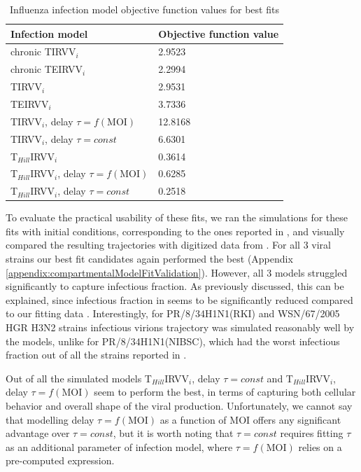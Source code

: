 \begin{table}[h!]
\centering
\caption[Influenza infection model objective function values for best fits]{Influenza infection model objective function values for best fits}
\label{table:ModelObjFunction}

\begin{tabular}{p{8cm} p{3cm}}
\hline 
\textbf{Infection model} & \textbf{Objective function value}\\
\hline
chronic TIRVV$_i$ & 2.9523\\
chronic TEIRVV$_i$ & 2.2994\\
\hline
TIRVV$_i$ & 2.9531\\
TEIRVV$_i$ &  3.7336\\
TIRVV$_i$, delay $\tau = f(\text{MOI})$ & 12.8168\\
TIRVV$_i$, delay $\tau = const$ & 6.6301\\
T$_{Hill}$IRVV$_i$ & 0.3614\\
T$_{Hill}$IRVV$_i$, delay $\tau = f(\text{MOI})$ & 0.6285\\
T$_{Hill}$IRVV$_i$, delay $\tau = const$ & 0.2518\\
\hline
\end{tabular}
\end{table}

To evaluate the practical usability of these fits, we ran the simulations for these fits with initial conditions, corresponding to the ones reported in \cite{schulze2009infection}, and visually compared the resulting trajectories with digitized data from \cite{schulze2009infection}. For all 3 viral strains our best fit candidates again performed the best (Appendix \ref{appendix:compartmentalModelFitValidation}). However, all 3 models struggled significantly to capture infectious fraction. As previously discussed, this can be explained, since infectious fraction in \cite{schulze2009infection} seems to be significantly reduced compared to our fitting data \cite{rudiger2019multiscale}. Interestingly, for PR/8/34H1N1(RKI) and WSN/67/2005 HGR H3N2 strains infectious virions trajectory was simulated reasonably well by the models, unlike for PR/8/34H1N1(NIBSC), which had the worst infectious fraction out of all the strains reported in \cite{schulze2009infection}.

Out of all the simulated models T$_{Hill}$IRVV$_i$, delay $\tau = const$ and T$_{Hill}$IRVV$_i$, delay $\tau = f(\text{MOI})$ seem to perform the best, in terms of capturing both cellular behavior and overall shape of the viral production. Unfortunately, we cannot say that modelling delay $\tau = f(\text{MOI})$ as a function of MOI offers any significant advantage over $\tau = const$, but it is worth noting that $\tau = const$ requires fitting $\tau$ as an additional parameter of infection model, where $\tau = f(\text{MOI})$ relies on a pre-computed expression.

